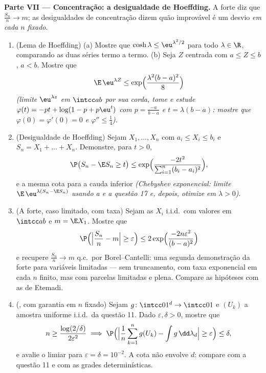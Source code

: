 \begin{problem}
\medskip
\noindent\textbf{Parte VII --- Concentração: a desigualdade de
Hoeffding.} A  forte diz que $\frac{S_n}n \to m$; as desigualdades de concentração
dizem quão improvável é um desvio \emph{em cada $n$ fixado}.
\begin{enumerate}[resume]
  \item (Lema de Hoeffding)
        (a) Mostre que $\cosh\lambda \leq \eu^{\lambda^2/2}$ para todo $\lambda \in \R$, comparando as duas séries
        termo a termo.
        (b) Seja $Z$ centrada com $a \leq Z \leq b$, $a < b$. Mostre que
        \[
        \E\,\eu^{\lambda Z} \leq
        \exp\Bigl(\frac{\lambda^2(b - a)^2}8\Bigr)
        \]
        \emph{(limite $\eu^{\lambda z}$ em $\intcc ab$ por sua corda, tome  e
        estude $\varphi(t)
        = -pt + \log(1 - p + p\eu^t)$ com $p =
        \frac{-a}{b-a}$ e $t = \lambda(b - a)$: mostre que $\varphi(0) = \varphi'(0) = 0$ e $\varphi''
        \leq \frac14$)}.
  \item (Desigualdade de Hoeffding) Sejam $X_1, \dots, X_n$  com $a_i \leq X_i \leq b_i$
        e $S_n =
        X_1 + \dots + X_n$. Demonstre, para $t > 0$,
        \[
        \P\bigl(S_n - \E S_n \geq t\bigr) \leq
        \exp\Bigl(\frac{-2t^2}{\sum_{i=1}^n(b_i -
        a_i)^2}\Bigr),
        \]
        e a mesma cota para a cauda inferior \emph{(Chebyshev
        exponencial: limite $\E\,\eu^{\lambda(S_n - \E S_n)}$ usando a  e a questão 17
        e, depois, otimize em $\lambda > 0$)}.
  \item (A  forte, caso limitado, com taxa) Sejam as $X_i$
        i.i.d.\ com valores em $\intcc ab$ e $m
        = \E X_1$. Mostre que
        \[
        \P\Bigl(\Bigl|\frac{S_n}n - m\Bigr| \geq
        \varepsilon\Bigr) \leq
        2\exp\Bigl(\frac{-2n\varepsilon^2}{(b - a)^2}\Bigr)
        \]
        e recupere $\frac{S_n}n \to m$ q.c.\ por Borel--Cantelli: uma segunda
        demonstração da  forte para variáveis limitadas --- sem
        truncamento, com taxa exponencial em cada $n$ finito, mas com
        parcelas limitadas e  plena. Compare as hipóteses
        com as de Etemadi.
  \item (, com garantia em $n$ fixado) Sejam $g
        \colon \intcc01^d \to \intcc01$
         e $(U_k)$ a amostra uniforme i.i.d.\ da questão
        11. Dado $\varepsilon, \delta > 0$, mostre que
        \[
        n \geq \frac{\log(2/\delta)}{2\varepsilon^2}
        \implies
        \P\Bigl(\Bigl|\frac1n\sum_{k=1}^ng(U_k) -
        \int g\,\dd\lambda_d\Bigr| \geq \varepsilon\Bigr)
        \leq \delta,
        \]
        e avalie o limiar para $\varepsilon =
        \delta = 10^{-2}$. A cota não envolve $d$: compare
        com a questão 11 e com as grades determinísticas.
\end{enumerate}


\end{problem}
